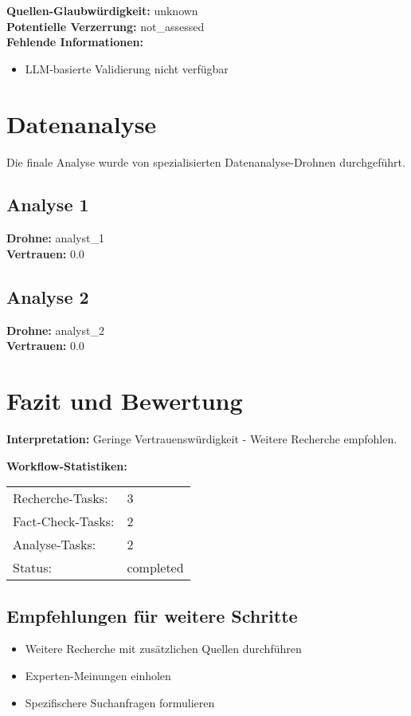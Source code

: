 \documentclass[12pt,a4paper]{article}
\begin{document}
\textbf{Quellen-Glaubwürdigkeit:} unknown\\
\textbf{Potentielle Verzerrung:} not\_assessed\\
\textbf{Fehlende Informationen:}
\begin{itemize}
\item LLM-basierte Validierung nicht verfügbar
\end{itemize}


\newpage
\section{Datenanalyse}

Die finale Analyse wurde von spezialisierten Datenanalyse-Drohnen durchgeführt.

\subsection{Analyse 1}

\textbf{Drohne:} analyst\_1\\
\textbf{Vertrauen:} 0.0%

\subsection{Analyse 2}

\textbf{Drohne:} analyst\_2\\
\textbf{Vertrauen:} 0.0%


\newpage
\section{Fazit und Bewertung}


\textbf{Interpretation:} Geringe Vertrauenswürdigkeit - Weitere Recherche empfohlen.

\textbf{Workflow-Statistiken:}
\begin{tabular}{ll}
Recherche-Tasks: & 3 \\
Fact-Check-Tasks: & 2 \\
Analyse-Tasks: & 2 \\
Status: & completed \\
\end{tabular}

\subsection{Empfehlungen für weitere Schritte}

\begin{itemize}
\item Weitere Recherche mit zusätzlichen Quellen durchführen
\item Experten-Meinungen einholen
\item Spezifischere Suchanfragen formulieren
\end{itemize}
\end{document}

